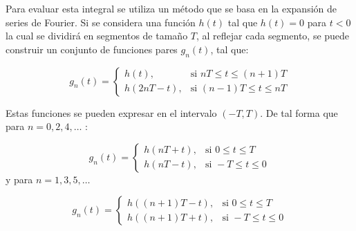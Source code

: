 \documentclass[11pt]{article}
\numberwithin{equation}{section} %
\begin{document}
Para evaluar esta integral se utiliza un método \cite{dubner1968} que se basa en la expansión de series de Fourier. Si se considera una función $h(t)$ tal que $h(t)=0$ para $t<0$ la cual se dividirá en segmentos de tamaño $T$, al reflejar cada segmento, se puede construir un conjunto de funciones pares $g_n(t)$, tal que:

\[
g_n(t) =
\begin{cases}
h(t), & \mbox{si } nT\leq t \leq (n+1)T \\
h(2nT-t), & \mbox{si } (n-1)T \leq t \leq nT
\end{cases}
\]

Estas funciones se pueden expresar en el intervalo $(-T,T)$. De tal forma que para $n=0,2,4,\ldots$ :

\[
g_n(t) =
\begin{cases}
h(nT+t), & \mbox{si } 0 \leq t \leq T \\
h(nT-t), & \mbox{si } -T \leq t \leq 0
\end{cases}
\]
y para $n=1,3,5,\ldots$

\[
g_n(t) =
\begin{cases}
h((n+1)T-t), & \mbox{si } 0 \leq t \leq T \\
h((n+1)T+t), & \mbox{si } -T \leq t \leq 0
\end{cases}
\]
\end{document}
